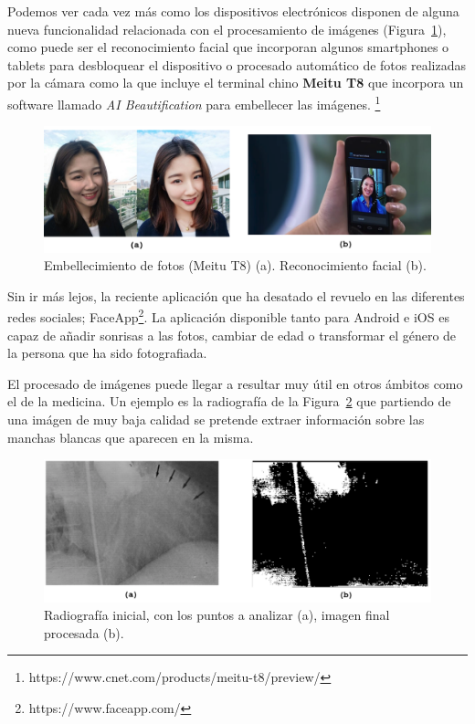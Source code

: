 Podemos ver cada vez más como los dispositivos electrónicos disponen de alguna nueva funcionalidad relacionada con el procesamiento de imágenes (Figura~\ref{fig:Face}), como puede ser el reconocimiento facial que incorporan algunos smartphones o tablets para desbloquear el dispositivo o procesado automático de fotos realizadas por la cámara como la que incluye el terminal chino \textbf{Meitu T8} que incorpora un software llamado \textit{AI Beautification} para embellecer las imágenes. \footnote{https://www.cnet.com/products/meitu-t8/preview/}

\begin{figure}[th]
\centering
\includegraphics[scale=0.43]{Figures/face.png}
\decoRule
\caption[Embellecimiento de fotos (Meitu T8)]{Embellecimiento de fotos (Meitu T8) (a). Reconocimiento facial (b).}
\label{fig:Face}
\end{figure}

Sin ir más lejos, la reciente aplicación que ha desatado el revuelo en las diferentes redes sociales; FaceApp\footnote{https://www.faceapp.com/}. La aplicación disponible tanto para Android e iOS es capaz de añadir sonrisas a las fotos, cambiar de edad o transformar el género de la persona que ha sido fotografiada.

El procesado de imágenes puede llegar a resultar muy útil en otros ámbitos como el de la medicina. Un ejemplo es la radiografía de la Figura~\ref{fig:Medicine} que partiendo de una imágen de muy baja calidad se  pretende  extraer  información  sobre  las  manchas
blancas que aparecen en la misma.

\begin{figure}[th]
\centering
\includegraphics[scale=0.4]{Figures/medicine.png}
\decoRule
\caption[Aplicaciones de radiografía en medicina]{Radiografía inicial, con los puntos a analizar (a), imagen final procesada (b).}
\label{fig:Medicine}
\end{figure}

